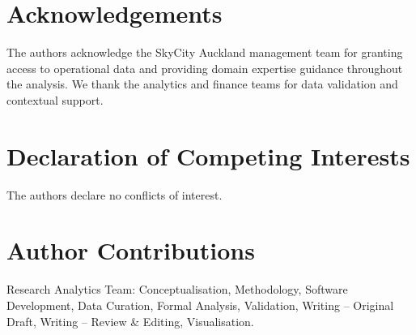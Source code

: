 \documentclass[10pt,a4paper,twocolumn]{article}
\begin{document}
\section*{Acknowledgements}
The authors acknowledge the SkyCity Auckland management team for granting access to
operational data and providing domain expertise guidance throughout the analysis. We
thank the analytics and finance teams for data validation and contextual support.

\section*{Declaration of Competing Interests}
The authors declare no conflicts of interest.

\section*{Author Contributions}
Research Analytics Team: Conceptualisation, Methodology, Software Development, Data
Curation, Formal Analysis, Validation, Writing -- Original Draft, Writing -- Review
\& Editing, Visualisation.


\end{document}
